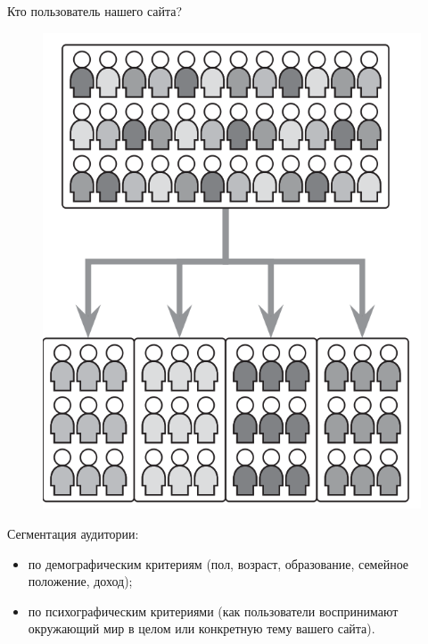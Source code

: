 \documentclass{beamer}
\begin{document}
\begin{frame}
Кто пользователь нашего сайта?
\begin{figure}[h]
\centering
\includegraphics[scale=0.25]{images/lec01-pic15.png}
\end{figure}
Сегментация аудитории:
	\begin{itemize}
	\item по демографическим критериям (пол, возраст, образование, семейное положение, доход);
	\item по психографическим критериями (как пользователи воспринимают окружающий мир в целом или конкретную тему вашего сайта).
	\end{itemize}
\end{frame}
\end{document}
